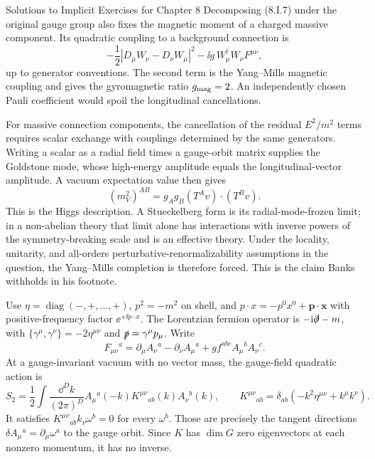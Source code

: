 \begin{bankssolutions}{Solutions to Implicit Exercises for Chapter 8}
Decomposing (8.I.7) under the original gauge group also fixes the magnetic
moment of a charged massive component.  Its quadratic coupling to a background
connection is
\[
 -\frac12|D_\mu W_\nu-D_\nu W_\mu|^2
 -\ii g\,W_\mu^\dagger W_\nu F^{\mu\nu},
\]
up to generator conventions.  The second term is the Yang--Mills magnetic
coupling and gives the gyromagnetic ratio $g_{\rm mag}=2$.  An independently
chosen Pauli coefficient would spoil the longitudinal cancellations.

For massive connection components, the cancellation of the residual
$E^2/m^2$ terms requires scalar exchange with couplings determined by the
same generators.  Writing a scalar as a radial field times a gauge-orbit
matrix supplies the Goldstone mode, whose high-energy amplitude equals the
longitudinal-vector amplitude.  A vacuum expectation value then gives
\[
 (m_V^2)^{AB}=g_Ag_B(T^Av)\mathbin{\cdot}(T^Bv).
\]
This is the Higgs description.  A Stueckelberg form is its radial-mode-frozen
limit; in a non-abelian theory that limit alone has interactions with inverse
powers of the symmetry-breaking scale and is an effective theory.  Under the
locality, unitarity, and all-orders perturbative-renormalizability assumptions
in the question, the Yang--Mills completion is therefore forced.  This is the
claim Banks withholds in his footnote.

Use $\eta=\operatorname{diag}(-,+,\ldots,+)$, $p^2=-m^2$ on shell, and
$p\cdot x=-p^0x^0+\mathbf p\cdot\mathbf x$ with positive-frequency factor
$\ee^{+\ii p\cdot x}$.  The Lorentzian fermion operator is
$-\mathrm{i}\slashed\partial-m$, with
$\{\gamma^\mu,\gamma^\nu\}=-2\eta^{\mu\nu}$ and
$\slashed p=\gamma^\mu p_\mu$.
Write
\[
 F_{\mu\nu}{}^a=\partial_\mu A_\nu{}^a-\partial_\nu A_\mu{}^a
 +gf^{abc}A_\mu{}^bA_\nu{}^c.
\]
At a gauge-invariant vacuum with no vector mass, the gauge-field quadratic
action is
\[
 S_2=\frac12\int\frac{\dd^D k}{(2\pi)^D}
 A_\mu{}^a(-k)K^{\mu\nu}{}_{ab}(k)A_\nu{}^b(k),
 \qquad
 K^{\mu\nu}{}_{ab}=\delta_{ab}(-k^2\eta^{\mu\nu}+k^\mu k^\nu).
 \tag{8.I.9}
\]
It satisfies $K^{\mu\nu}{}_{ab}k_\nu\omega^b=0$ for every $\omega^b$.
Those are precisely the tangent directions
$\delta A_\mu{}^a=\partial_\mu\omega^a$ to the gauge orbit.  Since $K$ has
$\dim G$ zero eigenvectors at each nonzero momentum, it has no inverse.


\end{bankssolutions}
